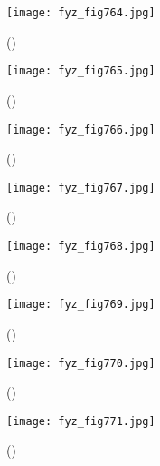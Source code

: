     \begin{figure}[ht!] %
      \centering
      \texttt{[image: fyz\_fig764.jpg]}
      \caption{
               (\cite[s.~707]{Feynman02})}
      \label{fyz_fig764}
    \end{figure}

    \begin{figure}[ht!] %
      \centering
      \texttt{[image: fyz\_fig765.jpg]}
      \caption{
               (\cite[s.~707]{Feynman02})}
      \label{fyz_fig765}
    \end{figure}
    
    \begin{figure}[ht!] %
      \centering
      \texttt{[image: fyz\_fig766.jpg]}
      \caption{
               (\cite[s.~707]{Feynman02})}
      \label{fyz_fig766}
    \end{figure}

    \begin{figure}[ht!] %
      \centering
      \texttt{[image: fyz\_fig767.jpg]}
      \caption{
               (\cite[s.~707]{Feynman02})}
      \label{fyz_fig767}
    \end{figure}

    \begin{figure}[ht!] %
      \centering
      \texttt{[image: fyz\_fig768.jpg]}
      \caption{
               (\cite[s.~707]{Feynman02})}
      \label{fyz_fig768}
    \end{figure}

    \begin{figure}[ht!] %
      \centering
      \texttt{[image: fyz\_fig769.jpg]}
      \caption{
               (\cite[s.~707]{Feynman02})}
      \label{fyz_fig769}
    \end{figure}

    \begin{figure}[ht!] %
      \centering
      \texttt{[image: fyz\_fig770.jpg]}
      \caption{
               (\cite[s.~707]{Feynman02})}
      \label{fyz_fig770}
    \end{figure}

    \begin{figure}[ht!] %
      \centering
      \texttt{[image: fyz\_fig771.jpg]}
      \caption{
               (\cite[s.~707]{Feynman02})}
      \label{fyz_fig771}
    \end{figure}

